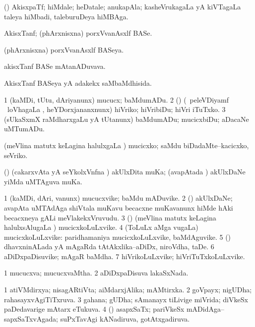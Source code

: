 \bentry
{}
\gl{\nA}
\bmng
(\aMrashA) AkisxpaTf; hiMdale; heDatale; anukapAla; kasheVrukagaLa yA kiVTagaLa taleya hiMbadi, taleburuDeya hiMBAga. 
\emng
\eentry

\bentry
{}
\gl{\nA}
\bmng
AkisxTanf; (phArxnisxna) porxVvanAsxlf BASe. 
\emng
\eentry

\bentry
{}
\gl{\gu}
\bmng
(phArxnisxna) porxVvanAsxlf BASeya. 
\emng
\eentry

\bentry
{}
\gl{\nA}
\bmng
akisxTanf BASe mAtanADuvava. 
\emng
\eentry

\bentry
{}
\gl{\gu}
\bmng
AkisxTanf BASeya yA adakekx saMbaMdhisida. 
\emng
\eentry

\bentry
{}
\gl{\sakirx}
\bmng
\bnum
\num{1} (kaMDi, tUtu, dAriyanunx) mucucx; baMdumADu. 
\num{2} (\ravi) (\kanmu\ peleVDiyamf \mo\ loVhagaLa \vi, heYDorxjananxnunx) hiVriko; hiVribiDu; hiVri iTuTxko. 
\num{3} (sUkaSxmX raMdharxgaLu yA tUtanunx) baMdumADu; mucicxbiDu; aDacaNe uMTumADu. 
\enum
\emng

\noindent
\gl{\akirx}
\bmng
(meVlina matutx keLagina halulxgaLa \vi) mucicxko; saMdu biDadaMte--kacicxko, seVriko. 
\emng
\eentry

\bentry
{}
\gl{\nA}
\bmng
(\pashA) (cakarxvAta yA seYkolxVnfna \vi) akUlxDita muKa; (avapAtada \vi) akUlxDaNe yiMda uMTAguva muKa. 
\emng
\eentry

\bentry
{}
\gl{\nA}
\bmng
\bnum
\num{1} (kaMDi, dAri, \mo vanunx) mucucxvike; baMdu mADuvike. 
\num{2} (\pashA) akUlxDaNe; avapAta uMTAdAga shiVtala muKavu becacxne muKavanunx hiMde hAki becacxneya gALi meVlakekxVruvudu. 
\num{3} (\daMveY) (meVlina matutx keLagina halulxsAlugaLa \vi) mucicxkoLuLxvike. 
\num{4} (ToLuLx aMga \mo vugaLa) mucicxkoLuLxvike:  paridhamaniya mucicxkoLuLxvike, baMdAguvike. 
\num{5} (\dhavxni) dhavxninALada yA mAgaRda tAtAkxlika--aDiDx, niroVdha, taDe. 
\num{6} aDiDxpaDisuvike; mAgaR baMdha. 
\num{7} hiVrikoLuLxvike; hiVriTuTxkoLuLxvike. 
\enum
\emng
\eentry

\bentry
{}
\gl{\gu}
\bmng
\bnum
\num{1} mucucxva; mucucxvaMtha. 
\num{2} aDiDxpaDisuva lakaSxNada. 
\enum
\emng
\eentry

\bentry
{}
\gl{\gu}
\bmng
\bnum
\num{1} atiVMdirxya; nisagARtiVta; aiMdarxjAlika; mAMtirxka. 
\num{2} goVpayx; nigUDha; rahasayxvAgiTiTxruva. 
\num{3} gahana; gUDha; sAmanayx tiLivige miVrida; diVkeSx paDedavarige mAtarx eTukuva. 
\num{4} (\veYshA) asapxSaTx; pariVkeSx mADidAga--sapxSaTxvAgada; suPxTavAgi kANadiruva, gotAtxgadiruva. 
\enum
\emng

